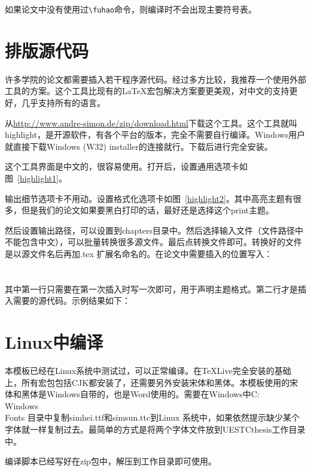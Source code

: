 如果论文中没有使用过\verb|\fuhao|命令，则编译时不会出现主要符号表。
\section{排版源代码}
\label{source:section}
许多学院的论文都需要插入若干程序源代码。经过多方比较，我推荐一个使用外部工具的方案。这个工具比现有的\LaTeX{}宏包解决方案要更美观，对中文的支持更好，几乎支持所有的语言。

从\url{http://www.andre-simon.de/zip/download.html}下载这个工具。这个工具就叫highlight，是开源软件，有各个平台的版本，完全不需要自行编译。Windows用户就直接下载Windows (W32) installer的连接就行。下载后进行完全安装。

这个工具界面是中文的，很容易使用。打开后，设置通用选项卡如图~\ref{highlight1}。

输出细节选项卡不用动。设置格式化选项卡如图~\ref{highlight2}。其中高亮主题有很多，但是我们的论文如果要黑白打印的话，最好还是选择这个print主题。

然后设置输出路径，可以设置到chapters目录中。然后选择输入文件（文件路径中不能包含中文），可以批量转换很多源文件。最后点转换文件即可。转换好的文件是以源文件名后再加.tex 扩展名命名的。在论文中需要插入的位置写入：\\
\verb||\\
\verb||\\
其中第一行只需要在第一次插入时写一次即可，用于声明主题格式。第二行才是插入需要的源代码。示例结果如下：


\section{Linux中编译}
本模板已经在Linux系统中测试过，可以正常编译。在TeXLive完全安装的基础上，所有宏包包括CJK都安装了，还需要另外安装宋体和黑体。本模板使用的宋体和黑体是Windows自带的，也是Word使用的。需要在Windows中C:\\Windows\\Fonts 目录中复制simhei.ttf和simsun.ttc到Linux 系统中，如果依然提示缺少某个字体就一样复制过去。最简单的方式是将两个字体文件放到UESTCthesis工作目录中。

编译脚本已经写好在zip包中，解压到工作目录即可使用。
